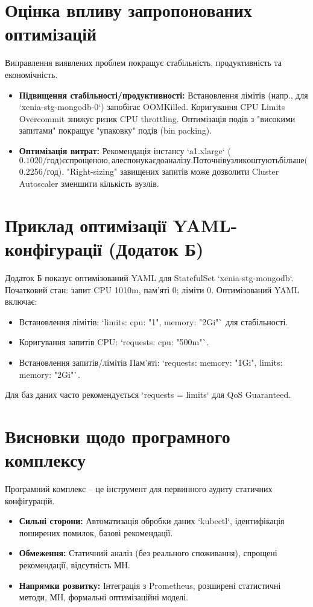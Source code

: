 \section{Оцінка впливу запропонованих оптимізацій}
Виправлення виявлених проблем покращує стабільність, продуктивність та економічність.
\begin{itemize}
	\item \textbf{Підвищення стабільності/продуктивності:} Встановлення лімітів (напр., для `xenia-stg-mongodb-0`) запобігає OOMKilled. Коригування CPU Limits Overcommit знижує ризик CPU throttling. Оптимізація подів з "високими запитами" покращує "упаковку" подів (bin packing).
	\item \textbf{Оптимізація витрат:} Рекомендація інстансу `a1.xlarge` ($0.1020/год) є спрощеною, але спонукає до аналізу. Поточні вузли коштують більше ($0.2256/год). "Right-sizing" завищених запитів може дозволити Cluster Autoscaler зменшити кількість вузлів.
\end{itemize}

\section{Приклад оптимізації YAML-конфігурації (Додаток Б)}
Додаток Б показує оптимізований YAML для StatefulSet `xenia-stg-mongodb`. Початковий стан: запит CPU 1010m, пам'яті 0; ліміти 0.
Оптимізований YAML включає:
\begin{itemize}
	\item Встановлення лімітів: `limits: cpu: "1", memory: "2Gi"` для стабільності.
	\item Коригування запитів CPU: `requests: cpu: "500m"`.
	\item Встановлення запитів/лімітів Пам'яті: `requests: memory: "1Gi", limits: memory: "2Gi"`.
\end{itemize}
Для баз даних часто рекомендується `requests = limits` для QoS Guaranteed.

\section{Висновки щодо програмного комплексу}
Програмний комплекс – це інструмент для первинного аудиту статичних конфігурацій.
\begin{itemize}
	\item \textbf{Сильні сторони:} Автоматизація обробки даних `kubectl`, ідентифікація поширених помилок, базові рекомендації.
	\item \textbf{Обмеження:} Статичний аналіз (без реального споживання), спрощені рекомендації, відсутність МН.
	\item \textbf{Напрямки розвитку:} Інтеграція з Prometheus, розширені статистичні методи, МН, формальні оптимізаційні моделі.
\end{itemize}